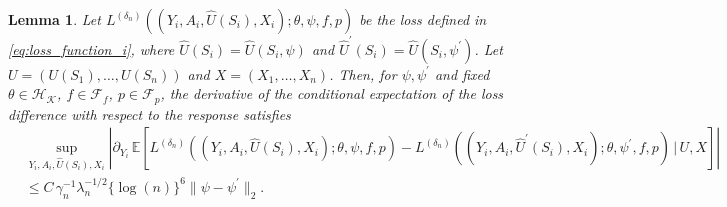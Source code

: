 \documentclass[12pt]{article}
\newtheorem{lemma}{Lemma}%
\newcommand{\E}{\mathbb{E}}
\begin{document}
\begin{lemma}\label{lemma:L_i_derivative_Y_diff_psi}
    Let $L^{(\delta_n)}((Y_i,A_i,\widehat U(S_i),X_i);\theta,\psi,f,p)$ be the loss defined in \eqref{eq:loss_function_i}, where $\widehat U(S_i)=\widehat U(S_i,\psi)$ and $\widehat U^\prime(S_i)=\widehat U(S_i,\psi^\prime)$.  Let $U=(U(S_1),\ldots,U(S_n))$ and $X=(X_1,\ldots,X_n)$.  Then, for $\psi,\psi^\prime$ and fixed $\theta\in\mathcal{H}_\mathcal{K}$, $f\in\mathcal{F}_f$, $p\in\mathcal{F}_p$, the derivative of the conditional expectation of the loss difference with respect to the response satisfies
    \begin{align*}
        &\sup_{Y_i,A_i,\widehat U(S_i),X_i}\left|\partial_{Y_i}\,\E\!\left[L^{(\delta_n)}((Y_i,A_i,\widehat U(S_i),X_i);\theta,\psi,f,p) - L^{(\delta_n)}((Y_i,A_i,\widehat U^\prime(S_i),X_i);\theta,\psi^\prime,f,p)\,\Big|\,U,X\right]\right|\\
        &\leq C\,\gamma_n^{-1}\lambda_n^{-1/2}\{\log(n)\}^6\|\psi - \psi^\prime\|_2.
    \end{align*}
\end{lemma}
\end{document}
